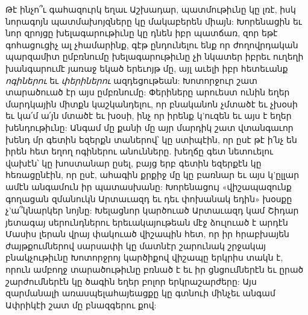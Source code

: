 \documentclass{article}
\begin{document}
{Թէ ինչո՞ւ գահազուրկ եղաւ Աշխադար, պատմութիւնը կը լռէ, իսկ նորագոյն պատմախոյզները կը մակաբերեն միայն: Խորենացին եւ նոր զրոյցը խելագարութիւնը կը դնեն իբր պատճառ, զոր եթէ գոհացուցիչ ալ չհամարինք, գէթ ընդունելու ենք որ ժողովրդական պարզամիտ ըմբռնումը խելագարութիւնը չի նկատեր իբրեւ ուղեղի խանգարումէ յառաջ եկած երեւոյթ մը, այլ աւելի իբր հետեւանք \emph{ոգիներու} եւ \emph{փերիներու} ազդեցութեան: Խոտորջուր շատ տարածուած էր այս ըմբռնումը: Փերիները արուեստ ունին եղեր մարդկային միտքն կաշկանդելու, որ բնականոն չմտածէ եւ չխօսի եւ կա՛մ ա՛յն մտածէ եւ խօսի, ինչ որ իրենք կ'ուզեն եւ այս է եղեր խենդութիւնը: Անգամ մը քանի մը այր մարդիկ շատ վտանգաւոր խենդ մր գետին եզերքն տաներով՝ կը ստիպէին, որ ըսէ թէ ի՛նչ են իրեն հետ եղող ոգիներու անունները. խեղճը գետ նետուելու վախէն՝ կը խոստանար ըսել, բայց երբ գետին եզերքէն կը հեռացընէին, որ ըսէ, ահագին քրքիջ մը կը բառնար եւ այս կ'ըլլար ամէն անգամուն իր պատասխանը: Խորենացույ «վիշապազունք գողացան զմանուկն Արտաւազդ եւ դեւ փոխանակ եդին» խօսքը չ'ա՞կնարկեր նոյնը: Խելացնոր կարծուած Արտաւազդ կամ Շիդար յետագայ սերունդներու երեւակայութեան մէջ ձուլուած է արդէն Մասիս լերան վրայ փակուած վիշապին հետ, որ իր հրաբխայեն ժայթքումներով սարսափի կը մատնէր շարունակ շրջակայ բնակչութիւնը Խոտորջրոյ կարծիքով վիշապը երկրիս տակն է, որուն ամբողջ տարածութիւնը բռնած է եւ իր ցնցումներէն եւ ըրած շարժումներէն կը ծագին եղեր բոլոր երկրաշարժերը: Այս զարմանալի առասպելահայեացքը կը գտնուի մինչեւ անգամ Ափրիկէի շատ մը բնազգերու քով:

}
\end{document}
